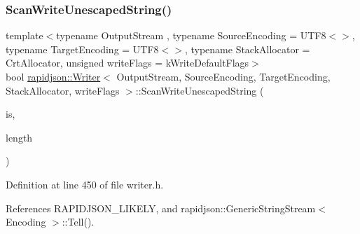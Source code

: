 \subsubsection{\texorpdfstring{ScanWriteUnescapedString()}{ScanWriteUnescapedString()}}
{\footnotesize\ttfamily template$<$typename Output\+Stream , typename Source\+Encoding  = U\+T\+F8$<$$>$, typename Target\+Encoding  = U\+T\+F8$<$$>$, typename Stack\+Allocator  = Crt\+Allocator, unsigned write\+Flags = k\+Write\+Default\+Flags$>$ \\
bool \mbox{\hyperlink{classrapidjson_1_1_writer}{rapidjson\+::\+Writer}}$<$ Output\+Stream, Source\+Encoding, Target\+Encoding, Stack\+Allocator, write\+Flags $>$\+::Scan\+Write\+Unescaped\+String (\begin{DoxyParamCaption}\item[{\mbox{\hyperlink{structrapidjson_1_1_generic_string_stream}{Generic\+String\+Stream}}$<$ Source\+Encoding $>$ \&}]{is,  }\item[{size\+\_\+t}]{length }\end{DoxyParamCaption})\hspace{0.3cm}{\ttfamily [protected]}}



Definition at line 450 of file writer.\+h.


\begin{DoxyCode}{0}

\end{DoxyCode}


References R\+A\+P\+I\+D\+J\+S\+O\+N\+\_\+\+L\+I\+K\+E\+LY, and rapidjson\+::\+Generic\+String\+Stream$<$ Encoding $>$\+::\+Tell().

\mbox{\label{classrapidjson_1_1_writer_aa7b6967dc237519e2a6d8b3939fb9634}} 
